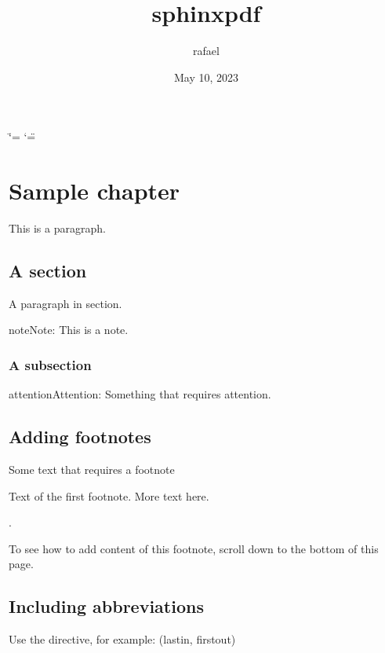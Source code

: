 \documentclass[letterpaper,10pt,english]{sphinxmanual}
\title{sphinx\sphinxhyphen{}pdf}
\date{May 10, 2023}
\author{rafael}
\begin{document}
\ifdefined\shorthandoff
  \ifnum\catcode`\=\string=\active\shorthandoff{=}\fi
  \ifnum\catcode`\"=\active{}\fi
\fi

\pagestyle{empty}
\sphinxmaketitle
\pagestyle{plain}
\sphinxtableofcontents
\pagestyle{normal}
\label{\detokenize{index::doc}}


\sphinxstepscope


\chapter{Sample chapter}
\label{\detokenize{sample-chapter:sample-chapter}}\label{\detokenize{sample-chapter::doc}}
\sphinxAtStartPar
This is a paragraph.


\section{A section}
\label{\detokenize{sample-chapter:a-section}}
\sphinxAtStartPar
A paragraph in section.

\begin{sphinxadmonition}{note}{Note:}
\sphinxAtStartPar
This is a note.
\end{sphinxadmonition}


\subsection{A subsection}
\label{\detokenize{sample-chapter:a-subsection}}
\begin{sphinxadmonition}{attention}{Attention:}
\sphinxAtStartPar
Something that requires attention.
\end{sphinxadmonition}


\section{Adding footnotes}
\label{\detokenize{sample-chapter:adding-footnotes}}
\sphinxAtStartPar
Some text that requires a footnote %
\begin{footnote}[1]\sphinxAtStartFootnote
Text of the first footnote.
More text here.
%
\end{footnote}.

\sphinxAtStartPar
To see how to add content of this footnote, scroll down to
the bottom of this page.


\section{Including abbreviations}
\label{\detokenize{sample-chapter:including-abbreviations}}
\sphinxAtStartPar
Use the  directive, for example:
 (last\sphinxhyphen{}in, first\sphinxhyphen{}out)
\end{document}
